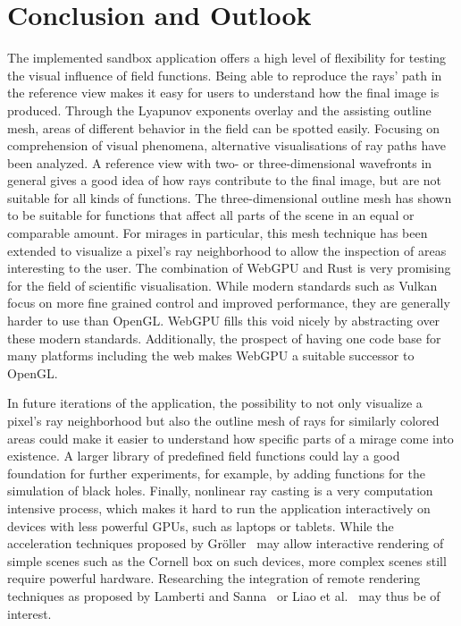 \chapter{Conclusion and Outlook}

The implemented sandbox application offers a high level of flexibility for testing the visual influence of field functions.
Being able to reproduce the rays' path in the reference view makes it easy for users to understand how the final image is produced.
Through the Lyapunov exponents overlay and the assisting outline mesh, areas of different behavior in the field can be spotted easily.
Focusing on comprehension of visual phenomena, alternative visualisations of ray paths have been analyzed.
A reference view with two- or three-dimensional wavefronts in general gives a good idea of how rays contribute to the final image, but are not suitable for all kinds of functions.
The three-dimensional outline mesh has shown to be suitable for functions that affect all parts of the scene in an equal or comparable amount.
For mirages in particular, this mesh technique has been extended to visualize a pixel's ray neighborhood to allow the inspection of areas interesting to the user.
The combination of WebGPU and Rust is very promising for the field of scientific visualisation.
While modern standards such as Vulkan focus on more fine grained control and improved performance, they are generally harder to use than OpenGL.
WebGPU fills this void nicely by abstracting over these modern standards.
Additionally, the prospect of having one code base for many platforms including the web makes WebGPU a suitable successor to OpenGL.

In future iterations of the application, the possibility to not only visualize a pixel's ray neighborhood but also the outline mesh of rays for similarly colored areas could make it easier to understand how specific parts of a mirage come into existence.
A larger library of predefined field functions could lay a good foundation for further experiments, for example, by adding functions for the simulation of black holes.
Finally, nonlinear ray casting is a very computation intensive process, which makes it hard to run the application interactively on devices with less powerful GPUs, such as laptops or tablets.
While the acceleration techniques proposed by Gröller~\cite{grollerNonlinearRayTracing1995} may allow interactive rendering of simple scenes such as the Cornell box on such devices, more complex scenes still require powerful hardware.
Researching the integration of remote rendering techniques as proposed by Lamberti and Sanna~\cite{lambertiStreamingBasedSolutionRemote2007} or Liao et al.~\cite{liaoLiveRenderCloudGaming2016} may thus be of interest.


